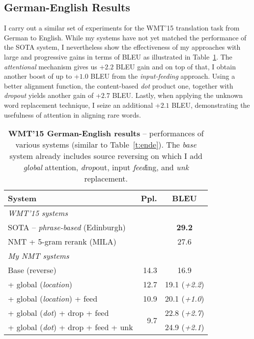 \subsection{German-English Results}
I carry out a similar set of experiments for the WMT'15 translation task from German
to English. 
While my systems have not yet matched the performance of the 
SOTA system, I nevertheless show the effectiveness of my
approaches with large and progressive gains in terms of BLEU as illustrated in
Table~\ref{t:deen}. 
The {\it attentional} mechanism gives us +$2.2$ BLEU gain and on top of that, I
obtain another boost of up to +$1.0$ BLEU from the {\it input-feeding} approach.
Using a better alignment function, the content-based {\it dot} product one,
together with {\it dropout} yields another gain of +$2.7$ BLEU. Lastly, when
applying the unknown word replacement technique, I seize an additional +$2.1$
BLEU, demonstrating the usefulness of attention in aligning rare words.
\begin{table}
\centering
\begin{tabular}{l|r|c}
\bf{System} & \bf{Ppl.} & \bf{BLEU}\\
  \hline
\multicolumn{3}{l}{{\it WMT'15 systems}}\\
  \hline
SOTA -- {\it phrase-based} (Edinburgh) &  & {\bf 29.2}\\ %
NMT + 5-gram rerank (MILA) &  & 27.6\\ %
  \hline
\multicolumn{3}{l}{{\it My NMT systems}}\\
  \hline
Base (reverse) & 14.3 & 16.9\\
  \hdashline
+ global ({\it location}) & 12.7 & 19.1 ({\it +2.2}) \\
+ global ({\it location}) + feed & 10.9 & 20.1 ({\it +1.0})\\
  \hdashline
+ global ({\it dot}) + drop + feed & \multirow{ 2}{*}{9.7} & 22.8 ({\it +2.7})\\
+ global ({\it dot}) + drop + feed + unk &  & 24.9 ({\it +2.1})\\
\end{tabular}
\caption[WMT'15 German-English results]{{\bf WMT'15 German-English results} -- 
performances of various systems (similar to 
Table~\ref{t:ende}). The {\it base} system already includes source reversing
on which I add {\it global} attention, {\it drop}out, input {\it feed}ing, and
{\it unk} replacement.}
\label{t:deen}
\end{table}


